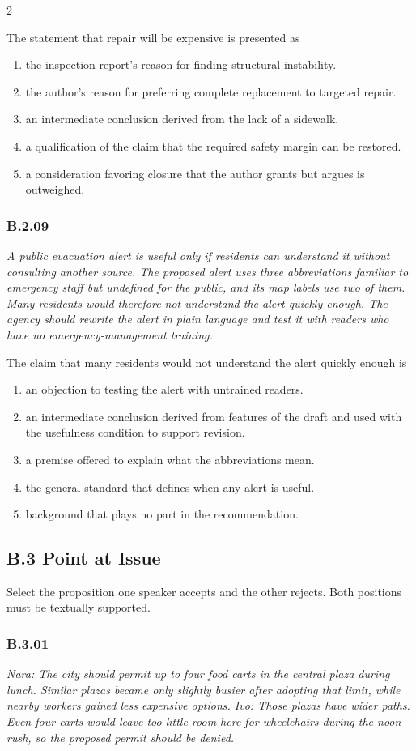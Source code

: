 \documentclass[10pt]{extarticle}
\newcommand{\choice}[1]{\item #1}
\newcommand{\bankitem}[1]{\subsubsection*{#1}}
\begin{document}
\begin{multicols}{2}
\begin{samepage}
The statement that repair will be expensive is presented as
\begin{enumerate}[label=(\alph*)]
  \choice{the inspection report's reason for finding structural instability.}
  \choice{the author's reason for preferring complete replacement to targeted repair.}
  \choice{an intermediate conclusion derived from the lack of a sidewalk.}
  \choice{a qualification of the claim that the required safety margin can be restored.}
  \choice{a consideration favoring closure that the author grants but argues is outweighed.}
\end{enumerate}
\end{samepage}\par\smallskip
\begin{samepage}
\bankitem{B.2.09}
\emph{A public evacuation alert is useful only if residents can understand it without consulting another source. The proposed alert uses three abbreviations familiar to emergency staff but undefined for the public, and its map labels use two of them. Many residents would therefore not understand the alert quickly enough. The agency should rewrite the alert in plain language and test it with readers who have no emergency-management training.}

The claim that many residents would not understand the alert quickly enough is
\begin{enumerate}[label=(\alph*)]
  \choice{an objection to testing the alert with untrained readers.}
  \choice{an intermediate conclusion derived from features of the draft and used with the usefulness condition to support revision.}
  \choice{a premise offered to explain what the abbreviations mean.}
  \choice{the general standard that defines when any alert is useful.}
  \choice{background that plays no part in the recommendation.}
\end{enumerate}
\end{samepage}\par\smallskip
\subsection*{B.3 Point at Issue}
Select the proposition one speaker accepts and the other rejects. Both positions must be textually supported.
\begin{samepage}
\bankitem{B.3.01}
\emph{Nara: The city should permit up to four food carts in the central plaza during lunch. Similar plazas became only slightly busier after adopting that limit, while nearby workers gained less expensive options. Ivo: Those plazas have wider paths. Even four carts would leave too little room here for wheelchairs during the noon rush, so the proposed permit should be denied.}


\end{samepage}
\end{multicols}
\end{document}
